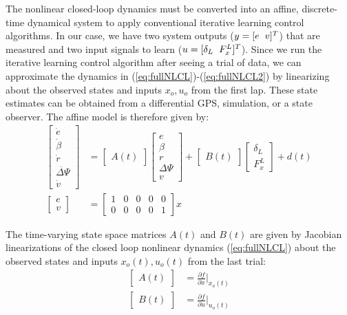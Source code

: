 \documentclass[9pt,shortpaper,twoside,web]{ieeecolor}
\begin{document}
The nonlinear closed-loop dynamics must be converted into an affine, discrete-time dynamical system to apply conventional iterative learning
control algorithms. In our case, we have two system outputs ($y = [e \hspace{2mm} v]^T$) that are measured and two input signals to learn ($u = [\delta_L \hspace{2mm} F^L_x]^T$). 
Since we run the iterative learning control algorithm after seeing a trial of data, we can approximate
the dynamics in (\ref{eq:fullNLCL})-(\ref{eq:fullNLCL2}) by linearizing about the observed states and inputs $x_o, u_o$ from the first lap. These state estimates can be obtained from a differential GPS, simulation, or a state observer. The affine model is therefore given by: 
 \begin{align}
 \label{eq:ssMAT}
 \begin{bmatrix} \dot{e} \\ \dot{\beta} \\ \dot{r} \\ \dot{\Delta\Psi} \\ \dot{v}\end{bmatrix} &= \begin{bmatrix} A(t) \end{bmatrix} \begin{bmatrix} e \\ \beta \\ r \\ \Delta\Psi \\ v \end{bmatrix} + \begin{bmatrix} B(t) \end{bmatrix} \begin{bmatrix} \delta_L \\ F^L_x \end{bmatrix} + d(t) \\
 \begin{bmatrix} e \\ v \end{bmatrix}  &= \begin{bmatrix} 1 & 0 & 0 & 0 & 0 \\ 0 & 0 & 0 & 0 & 1 \end{bmatrix} x
 \end{align}
 
 The time-varying state space matrices $A(t)$ and $B(t)$ are given by Jacobian linearizations of the closed loop nonlinear dynamics (\ref{eq:fullNLCL}) about the observed states and inputs $x_o(t), u_o(t)$ from the last trial:
 \begin{align}
 \label{eq:C4nl}
 \begin{bmatrix} A(t) \end{bmatrix} &= \frac{\partial{f}}{\partial{x}}\Big|_{x_o(t)} \\
 \begin{bmatrix} B(t) \end{bmatrix} &= \frac{\partial{f}}{\partial{u}}\Big|_{u_o(t)}
 \end{align}
\end{document}
